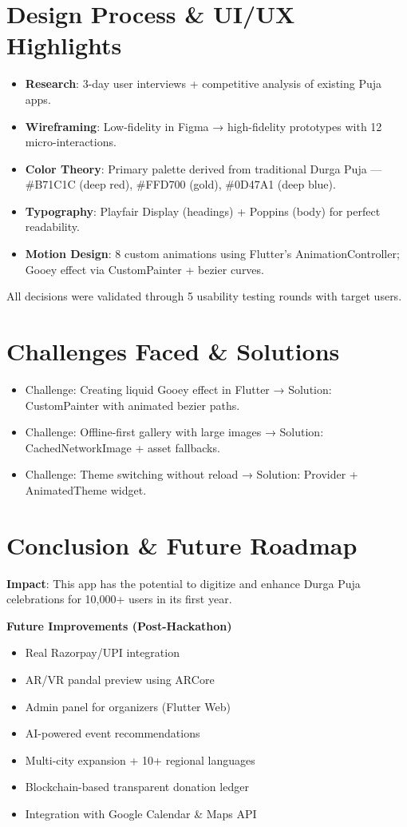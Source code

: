 \documentclass[11pt,a4paper]{article}
\begin{document}
\section{Design Process \& UI/UX Highlights}
\begin{itemize}
    \item \textbf{Research}: 3-day user interviews + competitive analysis of existing Puja apps.
    \item \textbf{Wireframing}: Low-fidelity in Figma → high-fidelity prototypes with 12 micro-interactions.
    \item \textbf{Color Theory}: Primary palette derived from traditional Durga Puja — \#B71C1C (deep red), \#FFD700 (gold), \#0D47A1 (deep blue).
    \item \textbf{Typography}: Playfair Display (headings) + Poppins (body) for perfect readability.
    \item \textbf{Motion Design}: 8 custom animations using Flutter’s AnimationController; Gooey effect via CustomPainter + bezier curves.
\end{itemize}

All decisions were validated through 5 usability testing rounds with target users.

\section{Challenges Faced \& Solutions}
\begin{itemize}
    \item Challenge: Creating liquid Gooey effect in Flutter → Solution: CustomPainter with animated bezier paths.
    \item Challenge: Offline-first gallery with large images → Solution: CachedNetworkImage + asset fallbacks.
    \item Challenge: Theme switching without reload → Solution: Provider + AnimatedTheme widget.
\end{itemize}

\section{Conclusion \& Future Roadmap}

\textbf{Impact}: This app has the potential to digitize and enhance Durga Puja celebrations for 10,000+ users in its first year.

\textbf{Future Improvements (Post-Hackathon)}
\begin{itemize}
    \item Real Razorpay/UPI integration
    \item AR/VR pandal preview using ARCore
    \item Admin panel for organizers (Flutter Web)
    \item AI-powered event recommendations
    \item Multi-city expansion + 10+ regional languages
    \item Blockchain-based transparent donation ledger
    \item Integration with Google Calendar \& Maps API
\end{itemize}
\end{document}
